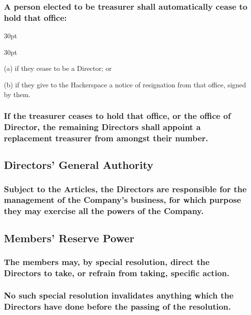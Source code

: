 \documentclass[12pt]{article}
\def\clauseindent{30pt}
\newenvironment{subindentlist}{\raggedright\begin{adjustwidth}{\clauseindent}{}\begin{labeledlist}{\clauseindent}}{\end{labeledlist}\end{adjustwidth}}
\begin{document}
\subsubsection[Automatic termination of Treasurer]{A person elected to be treasurer shall automatically cease to hold that office:}
\begin{subindentlist}
  \item [(a)] if they cease to be a Director; or
  \item [(b)] if they give to the Hackerspace a notice of resignation from that office, signed by them.
\end{subindentlist}
\subsubsection[Replacement treasurer must be appointed]{If the treasurer ceases to hold that office, or the office of Director, the remaining Directors shall appoint a replacement treasurer from amongst their number.}

\subsection{Directors' General Authority}
\subsubsection[Directors may exercise all powers of the Company]{Subject to the Articles, the Directors are responsible for the management of the Company's business, for which purpose they may exercise all the powers of the Company.}

\subsection{Members' Reserve Power}
\subsubsection[Members may instruct Directors]{The members may, by special resolution, direct the Directors to take, or refrain from taking, specific action.}
\subsubsection[Members' instruction may not invalidate Directors' actions]{No such special resolution invalidates anything which the Directors have done before the passing of the resolution.}
\end{document}
